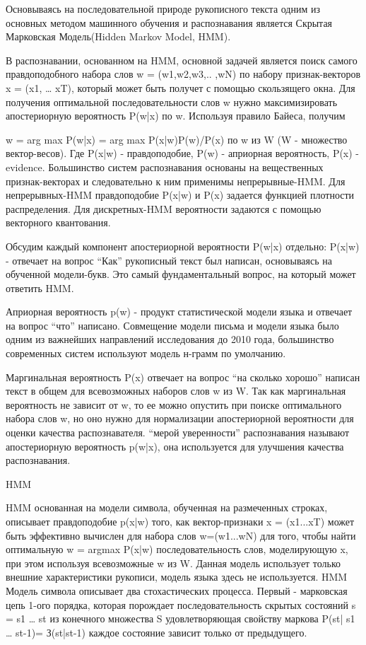 Основываясь на последовательной природе рукописного текста одним из основных методом машинного обучения и распознавания является Скрытая Марковская Модель(Hidden Markov Model, HMM).

В распознавании, основанном на HMM, основной задачей является поиск самого правдоподобного набора слов w = (w1,w2,w3,.. ,wN) по набору признак-векторов x = (x1, … xT), который может быть получет с помощью скользящего окна.
Для получения оптимальной последовательности слов w нужно максимизировать апостериорную вероятность P(w|x) по w. Используя правило Байеса, получим

w = arg max P(w|x) = arg max P(x|w)P(w)/P(x) по w из W (W - множество вектор-весов).
Где P(x|w) - правдоподобие, P(w) - априорная вероятность, P(x) - evidence.
Большинство систем распознавания основаны на вещественных признак-векторах и следовательно к ним применимы непрерывные-HMM. Для непрерывных-HMM правдоподобие P(x|w) и P(x) задается функцией плотности распределения. Для дискретных-HMM вероятности задаются с помощью векторного квантования.

Обсудим каждый компонент апостериорной вероятности P(w|x) отдельно:
P(x|w) - отвечает на вопрос “Как” рукописный текст был написан, основываясь на обученной модели-букв. Это самый фундаментальный вопрос, на который может ответить HMM.

Априорная вероятность p(w) - продукт статистической модели языка и отвечает на вопрос “что” написано. Совмещение модели письма и модели языка было одним из важнейших направлений исследования до 2010 года, большинство современных систем используют модель н-грамм по умолчанию.

Маргинальная вероятность P(x) отвечает на вопрос “на сколько хорошо” написан текст в общем для всевозможных наборов слов w из W. Так как маргинальная вероятность не зависит от w, то ее можно опустить при поиске оптимального набора слов w, но оно нужно для нормализации апостериорной вероятности для оценки качества распознавателя. “мерой уверенности” распознавания называют апостериорную вероятность p(w|x), она используется для улучшения качества распознавания.

HMM

HMM основанная на модели символа, обученная на размеченных строках, описывает правдоподобие p(x|w) того, как вектор-признаки x = (x1...xT) может быть эффективно вычислен для набора слов w=(w1...wN) для того, чтобы найти оптимальную w = argmax P(x|w) последовательность слов, моделирующую x, при этом используя всевозможные w из W. Данная модель использует только внешние характеристики рукописи, модель языка здесь не используется.
HMM Модель символа описывает два стохастических процесса.  Первый - марковская цепь 1-ого порядка, которая порождает последовательность скрытых состояний s = s1 … st из конечного множества S  удовлетворяющая свойству маркова P(st| s1 … st-1)= З(st|st-1) каждое состояние зависит только от предыдущего.

